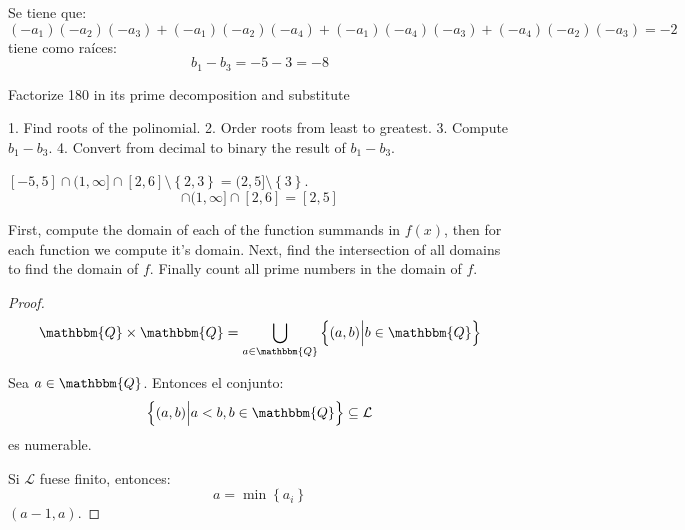 \documentclass[12pt]{report}
\theoremstyle{largebreak}
\newcommand{\bbm}[1]{\ensuremath{\mathbbm{#1}}}
\begin{document}
    \begin{sol}
        Se tiene que:
        \begin{equation*}
            (-a_1)(-a_2)(-a_3)+(-a_1)(-a_2)(-a_4)+(-a_1)(-a_4)(-a_3)+(-a_4)(-a_2)(-a_3)=-2
        \end{equation*}
        tiene como raíces:
        \begin{equation*}
            b_1-b_3=-5-3=-8
        \end{equation*}

        Factorize 180 in its prime decomposition and substitute 

        1. Find roots of the polinomial.
        2. Order roots from least to greatest.
        3. Compute $b_1-b_3$.
        4. Convert from decimal to binary the result of $b_1-b_3$.

    \end{sol}

    \begin{sol}
        $[-5,5]\cap (1,\infty]\cap[2,6]\setminus\left\{2,3 \right\}=(2,5]\setminus\left\{3\right\}$.
        \begin{equation*}
            [-5,5]\cap (1,\infty]\cap[2,6]=[2,5]
        \end{equation*}
    \end{sol}

    First, compute the domain of each of the function summands in $f(x)$, then for each function we compute it's domain. Next, find the intersection of all domains to find the domain of $f$. Finally count all prime numbers in the domain of $f$.

    \begin{proof}
        \begin{equation*}
            \begin{split}
                \bbm{Q}\times\bbm{Q}&=\bigcup_{ a\in\bbm{Q}}\left\{(a,b)\Big|b\in\bbm{Q} \right\}\\
            \end{split}
        \end{equation*}

        Sea $a\in\bbm{Q}$. Entonces el conjunto:
        \begin{equation*}
            \left\{(a,b)\Big|a<b,b\in\bbm{Q} \right\}\subseteq\mathcal{L}
        \end{equation*}
        es numerable.

        Si $\mathcal{L}$ fuese finito, entonces:
        \begin{equation*}
            a=\min\left\{a_i \right\}
        \end{equation*}
        $(a-1,a)$.
    \end{proof}
\end{document}

